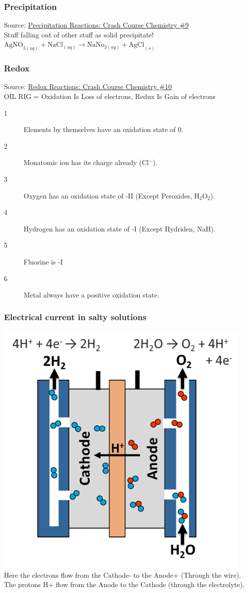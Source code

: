 \subsubsection{Precipitation}
Source: \href{https://www.youtube.com/watch?v=IIu16dy3ThI&list=PL8dPuuaLjXtPHzzYuWy6fYEaX9mQQ8oGr&index=10}{Precipitation Reactions: Crash Course Chemistry \#9}
\\
Stuff falling out of other stuff as solid precipitate!\\
$\text{AgNO}_{3(aq)}+\text{NaCl}_{(aq)} \to \text{NaNo}_{3(aq)} + \text{AgCl}_{(s)}$
\subsubsection{Redox}
Source: \href{https://www.youtube.com/watch?v=lQ6FBA1HM3s&list=PL8dPuuaLjXtPHzzYuWy6fYEaX9mQQ8oGr&index=11}{Redox Reactions: Crash Course Chemistry \#10}
\\
OIL RIG = Oxidation Is Loss of electrons, Redux Is Gain of electrons\\

\begin{description}
    \item[1] Elements by themselves have an oxidation state of 0.
    \item[2] Monatomic ion has its charge already (Cl$^-$).
    \item[3] Oxygen has an oxidation state of -II (Except Peroxides, H$_2$O$_2$).
    \item[4] Hydrogen has an oxidation state of -I (Except Hydriden, NaH).
    \item[5] Fluorine is -I
    \item[6] Metal always have a positive oxidation state. 
\end{description}

\subsubsection{Electrical current in salty solutions}

\includegraphics{./includes/chemistry/imgs/electrolyzer.png}
\\
Here the electrons flow from the Cathode- to the Anode+ (Through the wire).\\
The protons H+ flow from the Anode to the Cathode (through the electrolyte).
